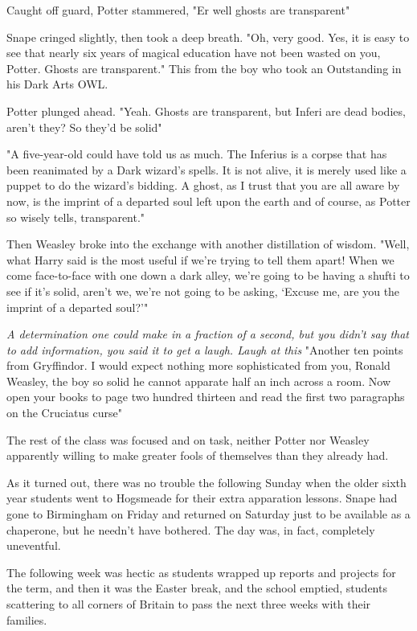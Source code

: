 Caught off guard, Potter stammered, "Er{\el} well{\el} ghosts are transparent{\el}"

Snape cringed slightly, then took a deep breath. "Oh, very good. Yes, it is easy to see that nearly six years of magical education have not been wasted on you, Potter. Ghosts are transparent." This from the boy who took an Outstanding in his Dark Arts OWL.

Potter plunged ahead. "Yeah. Ghosts are transparent, but Inferi are dead bodies, aren't they? So they'd be solid{\el}"

"A five-year-old could have told us as much. The Inferius is a corpse that has been reanimated by a Dark wizard's spells. It is not alive, it is merely used like a puppet to do the wizard's bidding. A ghost, as I trust that you are all aware by now, is the imprint of a departed soul left upon the earth{\el} and of course, as Potter so wisely tells, transparent."

Then Weasley broke into the exchange with another distillation of wisdom. "Well, what Harry said is the most useful if we're trying to tell them apart! When we come face-to-face with one down a dark alley, we're going to be having a shufti to see if it's solid, aren't we, we're not going to be asking, `Excuse me, are you the imprint of a departed soul?'"

\emph{A determination one could make in a fraction of a second, but you didn't say that to add information, you said it to get a laugh. Laugh at this{\el}} "Another ten points from Gryffindor. I would expect nothing more sophisticated from you, Ronald Weasley, the boy so solid he cannot apparate half an inch across a room. Now open your books to page two hundred thirteen and read the first two paragraphs on the Cruciatus curse{\el}"

The rest of the class was focused and on task, neither Potter nor Weasley apparently willing to make greater fools of themselves than they already had.

As it turned out, there was no trouble the following Sunday when the older sixth year students went to Hogsmeade for their extra apparation lessons. Snape had gone to Birmingham on Friday and returned on Saturday just to be available as a chaperone, but he needn't have bothered. The day was, in fact, completely uneventful.

The following week was hectic as students wrapped up reports and projects for the term, and then it was the Easter break, and the school emptied, students scattering to all corners of Britain to pass the next three weeks with their families.

